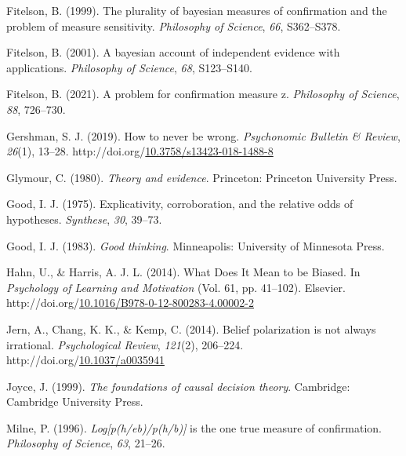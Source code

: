 \documentclass[10pt, letterpaper]{article}
\newenvironment{CSLReferences}%
  {}%
  {\par}
\begin{document}
\begin{CSLReferences}
\leavevmode{}%
Fitelson, B. (1999). The plurality of bayesian measures of confirmation
and the problem of measure sensitivity. \emph{Philosophy of Science},
\emph{66}, S362--S378.

\leavevmode{}%
Fitelson, B. (2001). A bayesian account of independent evidence with
applications. \emph{Philosophy of Science}, \emph{68}, S123--S140.

\leavevmode{}%
Fitelson, B. (2021). A problem for confirmation measure z.
\emph{Philosophy of Science}, \emph{88}, 726--730.

\leavevmode{}%
Gershman, S. J. (2019). How to never be wrong. \emph{Psychonomic
Bulletin \& Review}, \emph{26}(1), 13--28.
http://doi.org/\href{https://doi.org/10.3758/s13423-018-1488-8}{10.3758/s13423-018-1488-8}

\leavevmode{}%
Glymour, C. (1980). \emph{Theory and evidence}. Princeton: Princeton
University Press.

\leavevmode{}%
Good, I. J. (1975). Explicativity, corroboration, and the relative odds
of hypotheses. \emph{Synthese}, \emph{30}, 39--73.

\leavevmode{}%
Good, I. J. (1983). \emph{Good thinking}. Minneapolis: University of
Minnesota Press.

\leavevmode{}%
Hahn, U., \& Harris, A. J. L. (2014). What {Does} {It} {Mean} to be
{Biased}. In \emph{Psychology of {Learning} and {Motivation}} (Vol. 61,
pp. 41--102). Elsevier.
http://doi.org/\href{https://doi.org/10.1016/B978-0-12-800283-4.00002-2}{10.1016/B978-0-12-800283-4.00002-2}

\leavevmode{}%
Jern, A., Chang, K. K., \& Kemp, C. (2014). Belief polarization is not
always irrational. \emph{Psychological Review}, \emph{121}(2), 206--224.
http://doi.org/\href{https://doi.org/10.1037/a0035941}{10.1037/a0035941}

\leavevmode{}%
Joyce, J. (1999). \emph{The foundations of causal decision theory}.
Cambridge: Cambridge University Press.

\leavevmode{}%
Milne, P. (1996). \emph{Log{[}p(h/eb)/p(h/b){]}} is the one true measure
of confirmation. \emph{Philosophy of Science}, \emph{63}, 21--26.


\end{CSLReferences}
\end{document}
